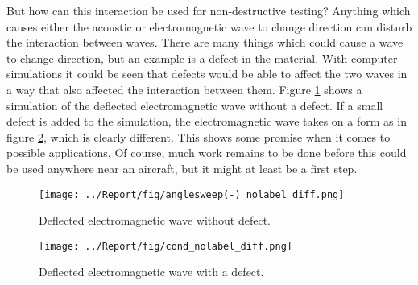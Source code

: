 \documentclass[11pt]{article}
\begin{document}
\begin{multicols}{2}
		But how can this interaction be used for non-destructive testing? Anything which causes either the acoustic or electromagnetic wave to change direction can disturb the interaction between waves. There are many things which could cause a wave to change direction, but an example is a defect in the material. With computer simulations it could be seen that defects would be able to affect the two waves in a way that also affected the interaction between them. Figure \ref{fig:nodefect} shows a simulation of the deflected electromagnetic wave without a defect. If a small defect is added to the simulation, the electromagnetic wave takes on a form as in figure \ref{fig:conddefect}, which is clearly different. This shows some promise when it comes to possible applications. Of course, much work remains to be done before this could be used anywhere near an aircraft, but it might at least be a first step.
		
		\begin{figure}[H]
			\centering
			\texttt{[image: ../Report/fig/anglesweep(-)\_nolabel\_diff.png]}
			\caption{\label{fig:nodefect} Deflected electromagnetic wave without defect.}
		\end{figure}
		
		\begin{figure}[H]
			\centering
			\texttt{[image: ../Report/fig/cond\_nolabel\_diff.png]}
			\caption{\label{fig:conddefect} Deflected electromagnetic wave with a defect.}
		\end{figure}
		
	\end{multicols}
	
\end{document}
